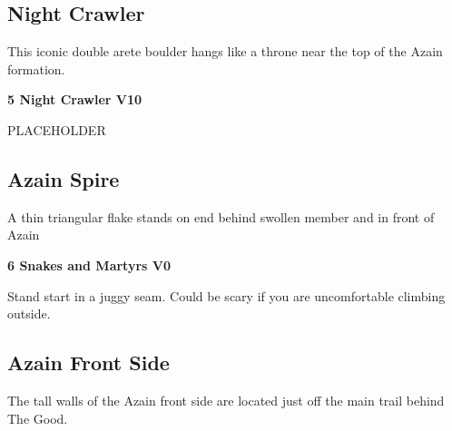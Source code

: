 \begin{multicols}{2}
			\subsection*{Night Crawler}\label{bf:Night Crawler}
			\begin{minipage}{\columnwidth}
			This iconic double arete boulder hangs like a throne near the top of the Azain formation.
			\end{minipage}
			

					\begin{minipage}{\linewidth}	
					\label{rt:Night Crawler}
\colorbox{red!20}{
\parbox{0.95\textwidth}{
\textbf{
5 Night Crawler V10  
}
}
}

					\begin{adjustwidth}{0.5cm}{}				
					PLACEHOLDER
					\end{adjustwidth}
					\end{minipage}
			\subsection*{Azain Spire}\label{bf:Azain Spire}
			\begin{minipage}{\columnwidth}
			A thin triangular flake stands on end behind swollen member and in front of Azain
			\end{minipage}
			

					\begin{minipage}{\linewidth}	
					\label{rt:Snakes and Martyrs}
\colorbox{green!20}{
\parbox{0.95\textwidth}{
\textbf{
6 Snakes and Martyrs V0     
}
}
}

					\begin{adjustwidth}{0.5cm}{}				
					 Stand start in a juggy seam. Could be scary if you are uncomfortable climbing outside.
					\end{adjustwidth}
					\end{minipage}
			\subsection*{Azain Front Side}\label{bf:Azain Front Side}
			\begin{minipage}{\columnwidth}
			The tall walls of the Azain front side are located just off the main trail behind The Good.
			\end{minipage}
			

\end{multicols}
